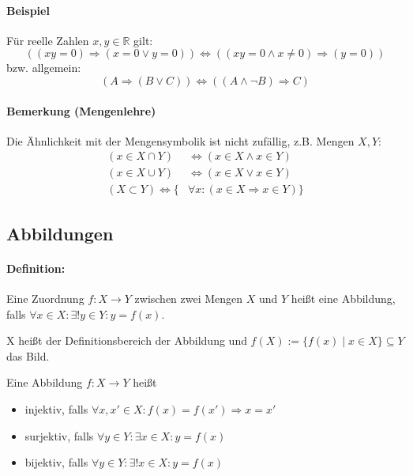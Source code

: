 \documentclass[12pt,a4paper,parskip=half-,DIV=15]{scrartcl}
\begin{document}
\paragraph{Beispiel} Für reelle Zahlen $x,y\in\mathbb{R}$ gilt:
\begin{equation*}
\left((xy = 0)\Rightarrow (x=0 \lor y=0)\right) \Leftrightarrow \left((xy=0 \land x \neq 0)\Rightarrow (y =0)\right)
\end{equation*}
bzw. allgemein:
\begin{equation*}
(A\Rightarrow (B\lor C))\Leftrightarrow ((A\land\lnot B)\Rightarrow C)
\end{equation*}

\paragraph{Bemerkung (Mengenlehre)} Die Ähnlichkeit mit der Mengensymbolik ist nicht zufällig, z.B. Mengen $X, Y$:
\begin{align*}
(x\in X\cap Y)&\Leftrightarrow (x\in X\land x\in Y)\\
(x\in X\cup Y)&\Leftrightarrow (x\in X\lor x\in Y)\\
(X\subset Y) \Leftrightarrow \{&\forall x : (x\in X \Rightarrow x\in Y)\}
\end{align*}

\subsection{Abbildungen}
\paragraph{Definition:} Eine Zuordnung $f: X\to Y$ zwischen zwei Mengen $X$ und $Y$ heißt eine Abbildung, falls $\forall x\in X: \exists ! y\in Y: y=f(x)$.

X heißt der Definitionsbereich der Abbildung und $f(X):=\{f(x)\mid x\in X \}\subseteq Y$ das Bild.

Eine Abbildung $f: X\to Y$ heißt
\begin{itemize}
\item injektiv, falls $\forall x,x'\in X:f(x) = f(x') \Rightarrow x=x'$
\item surjektiv, falls $\forall y\in Y:\exists x\in X: y = f(x)$
\item bijektiv, falls $\forall y\in Y:\exists !x\in X: y = f(x)$
\end{itemize}
\end{document}
